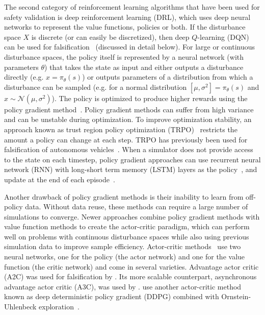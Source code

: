 The second category of reinforcement learning algorithms that have been used for safety validation is
deep reinforcement learning (DRL), which uses deep neural networks to represent the value functions, policies or both. If the disturbance space $X$ is discrete (or can easily be discretized), then deep $Q$-learning (DQN)~\cite{mnih2015human} can be used for falsification~\cite{Akazaki2018falsification,qin2019automatic} (discussed in detail below). For large or continuous disturbance spaces, the policy itself is represented by a neural network (with parameters $\theta$) that takes the state as input and either outputs a disturbance directly (e.g. $x = \pi_\theta(s)$) or outputs parameters of a distribution from which a disturbance can be sampled (e.g. for a normal distribution $[\mu, \sigma^2] = \pi_\theta(s)$ and $x \sim \mathcal{N}(\mu, \sigma^2)$). The policy is optimized to produce higher rewards using the policy gradient method~\cite{sutton2000policy}. Policy gradient methods can suffer from high variance and can be unstable during optimization. To improve optimization stability, an approach known as trust region policy optimization (TRPO)~\cite{schulman2015trust} restricts the amount a policy can change at each step. TRPO has previously been used for falsification of autonomous vehicles~\cite{koren2018adaptive,koren2019efficient,corso2019adaptive}. When a simulator does not provide access to the state on each timestep, policy gradient approaches can use recurrent neural network (RNN) with long-short term memory (LSTM) layers as the policy~\cite{hochreiter1997long}, and update at the end of each episode~\cite{koren2019efficient}.

Another drawback of policy gradient methods is their inability to learn from off-policy data. Without data reuse, these methods can require a large number of simulations to converge. Newer approaches combine policy gradient methods with value function methods to create the actor-critic paradigm, which can perform well on problems with continuous disturbance spaces while also using previous simulation data to improve sample efficiency. Actor-critic methods~\cite{mnih2016asynchronous} use two neural networks, one for the policy (the actor network) and one for the value function (the critic network) and come in several varieties. Advantage actor critic (A2C) was used for falsification by \textcite{kuutti2020training}. Its more scalable counterpart, asynchronous advantage actor critic (A3C), was used by \textcite{Akazaki2018falsification}. \textcite{behzadan2019adversarial} use another actor-critic method known as deep deterministic policy gradient (DDPG) combined with Ornstein-Uhlenbeck exploration~\cite{lillicrap2015continuous}. 



